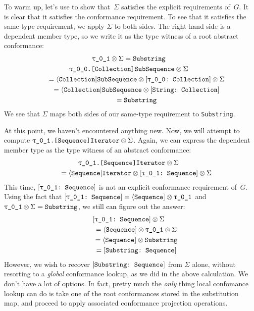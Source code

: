 \documentclass[../generics]{subfiles}
\begin{document}
\begin{example}
To warm up, let's use  to show that~$\Sigma$ satisfies the explicit requirements of~$G$. It is clear that it satisfies the conformance requirement. To see that it satisfies the same-type requirement, we apply $\Sigma$ to both sides. The right-hand side is a dependent member type, so we write it as the type witness of a root abstract conformance:
\begin{gather*}
\rU \otimes \Sigma = \texttt{Substring}\\
\texttt{\rT.[Collection]SubSequence} \otimes \Sigma\\
\qquad {} = \ASubSequence \otimes \rTCollection \otimes \Sigma\\
\qquad {} = \ASubSequence \otimes \StringCollection\\
\qquad {} = \texttt{Substring}
\end{gather*}
We see that $\Sigma$ maps both sides of our same-type requirement to \texttt{Substring}.

At this point, we haven't encountered anything new. Now, we will attempt to compute $\texttt{\rU.[Sequence]Iterator} \otimes \Sigma$. Again, we can express the dependent member type as the type witness of an abstract conformance:
\begin{gather*}
\texttt{\rU.[Sequence]Iterator} \otimes \Sigma \\
\qquad {} = \AIterator \otimes \rUSequence \otimes \Sigma
\end{gather*}
This time, $\rUSequence$ is not an explicit conformance requirement of~$G$. Using the fact that $\rUSequence=\Proto{Sequence}\otimes\rU$ and $\rU\otimes \Sigma=\texttt{Substring}$, we still can figure out the answer:
\begin{gather*}
\rUSequence\otimes \Sigma\\
\qquad {} = \Proto{Sequence} \otimes \rU \otimes \Sigma\\
\qquad {} = \Proto{Sequence} \otimes \texttt{Substring}\\
\qquad {} = \SubstringSequence
\end{gather*}
However, we wish to recover $[\texttt{Substring:~Sequence}]$ from $\Sigma$ alone, without resorting to a \emph{global} conformance lookup, as we did in the above calculation. We don't have a lot of options. In fact, pretty much the \emph{only} thing local confomance lookup can do is take one of the root conformances stored in the substitution map, and proceed to apply associated conformance projection operations.


\end{example}
\end{document}
